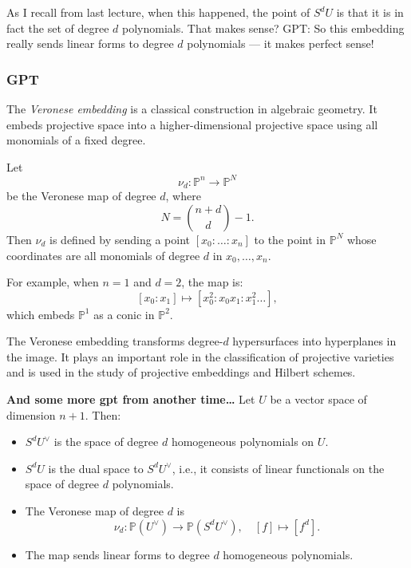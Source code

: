 \begin{remark}\leavevmode
As I recall from last lecture, when this happened, the point of \(S^dU\) is that it is in fact the set of degree \(d\) polynomials. That makes sense? GPT: So this embedding really sends linear forms to degree \( d \) polynomials — it makes perfect sense!
\end{remark}

\subsubsection{GPT}
 The \emph{Veronese embedding} is a classical construction in algebraic geometry. It embeds projective space into a higher-dimensional projective space using all monomials of a fixed degree.

Let
\[
\nu_d : \mathbb{P}^n \to \mathbb{P}^N
\]
be the Veronese map of degree \( d \), where
\[
N = \binom{n + d}{d} - 1.
\]
Then \( \nu_d \) is defined by sending a point \( [x_0 : \dots : x_n] \) to the point in \( \mathbb{P}^N \) whose coordinates are all monomials of degree \( d \) in \( x_0, \dots, x_n \).

For example, when \( n = 1 \) and \( d = 2 \), the map is:
\[
[x_0 : x_1] \mapsto [x_0^2 : x_0x_1 : x_1^2\ldots],
\]
which embeds \( \mathbb{P}^1 \) as a conic in \( \mathbb{P}^2 \).

The Veronese embedding transforms degree-\( d \) hypersurfaces into hyperplanes in the image. It plays an important role in the classification of projective varieties and is used in the study of projective embeddings and Hilbert schemes.


\textbf{And some more gpt from another time…} 
Let \( U \) be a vector space of dimension \( n+1 \). Then:

\begin{itemize}
  \item \( S^d U^\vee \) is the space of degree \( d \) homogeneous polynomials on \( U \).
  \item \( S^d U \) is the dual space to \( S^d U^\vee \), i.e., it consists of linear functionals on the space of degree \( d \) polynomials.
  \item The Veronese map of degree \( d \) is
  \[
    \nu_d : \mathbb{P}(U^\vee) \longrightarrow \mathbb{P}(S^d U^\vee), \quad [f] \mapsto [f^d].
  \]
  \item The map sends linear forms to degree \( d \) homogeneous polynomials.
\end{itemize}

